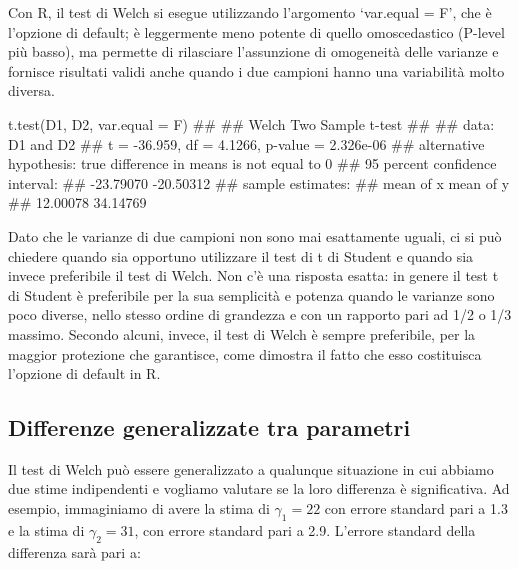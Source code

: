 \documentclass[a4paper,12pt,oneside]{book}
\newenvironment{Shaded}{\begin{snugshade}}{\end{snugshade}}
\newcommand{\DocumentationTok}[1]{#1}
\newcommand{\FunctionTok}[1]{#1}
\newcommand{\AttributeTok}[1]{#1}
\newcommand{\NormalTok}[1]{#1}
\begin{document}
Con R, il test di Welch si esegue utilizzando l'argomento `var.equal = F', che è l'opzione di default; è leggermente meno potente di quello omoscedastico (P-level più basso), ma permette di rilasciare l'assunzione di omogeneità delle varianze e fornisce risultati validi anche quando i due campioni hanno una variabilità molto diversa.

\begin{Shaded}
\begin{Highlighting}[]
\FunctionTok{t.test}\NormalTok{(D1, D2, }\AttributeTok{var.equal =}\NormalTok{ F)}
\DocumentationTok{\#\# }
\DocumentationTok{\#\#  Welch Two Sample t{-}test}
\DocumentationTok{\#\# }
\DocumentationTok{\#\# data:  D1 and D2}
\DocumentationTok{\#\# t = {-}36.959, df = 4.1266, p{-}value = 2.326e{-}06}
\DocumentationTok{\#\# alternative hypothesis: true difference in means is not equal to 0}
\DocumentationTok{\#\# 95 percent confidence interval:}
\DocumentationTok{\#\#  {-}23.79070 {-}20.50312}
\DocumentationTok{\#\# sample estimates:}
\DocumentationTok{\#\# mean of x mean of y }
\DocumentationTok{\#\#  12.00078  34.14769}
\end{Highlighting}
\end{Shaded}

Dato che le varianze di due campioni non sono mai esattamente uguali, ci si può chiedere quando sia opportuno utilizzare il test di t di Student e quando sia invece preferibile il test di Welch. Non c'è una risposta esatta: in genere il test t di Student è preferibile per la sua semplicità e potenza quando le varianze sono poco diverse, nello stesso ordine di grandezza e con un rapporto pari ad 1/2 o 1/3 massimo. Secondo alcuni, invece, il test di Welch è sempre preferibile, per la maggior protezione che garantisce, come dimostra il fatto che esso costituisca l'opzione di default in R.

\hypertarget{differenze-generalizzate-tra-parametri}{%
\subsection{Differenze generalizzate tra parametri}\label{differenze-generalizzate-tra-parametri}}

Il test di Welch può essere generalizzato a qualunque situazione in cui abbiamo due stime indipendenti e vogliamo valutare se la loro differenza è significativa. Ad esempio, immaginiamo di avere la stima di \(\gamma_1 = 22\) con errore standard pari a 1.3 e la stima di \(\gamma_2 = 31\), con errore standard pari a 2.9. L'errore standard della differenza sarà pari a:
\end{document}
